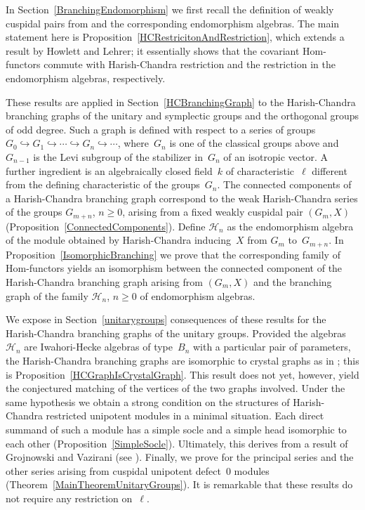 \documentclass[twoside,12pt]{amsart}
\theoremstyle{plain}
\begin{document}
In Section~\ref{BranchingEndomorphism} we first recall the definition of weakly cuspidal pairs from
\cite{GerberHissJacon2014} and the corresponding endomorphism algebras.
The main statement here is Proposition~\ref{HCRestricitonAndRestriction}, which 
extends a result by Howlett and Lehrer; it essentially shows
that the covariant Hom-functors commute with Harish-Chandra restriction
and the restriction in the endomorphism algebras, respectively. 

These results are applied in Section~\ref{HCBranchingGraph} to the Harish-Chandra branching graphs 
of the unitary and symplectic groups and the orthogonal groups of odd degree. 
Such a graph is defined with respect to a series of groups $G_0 \hookrightarrow 
G_1 \hookrightarrow \cdots \hookrightarrow G_n \hookrightarrow \cdots$, 
where~$G_n$ is one of the classical groups above and~$G_{n-1}$ is the Levi 
subgroup of the stabilizer in~$G_n$ of an isotropic vector. A further ingredient
is an algebraically closed field~$k$ of characteristic~$\ell$ different from the
defining characteristic of the groups~$G_n$.
The connected components of a Harish-Chandra branching graph correspond
to the weak Harish-Chandra series of the groups $G_{m + n}$, $n \geq 0$, arising 
from a fixed weakly cuspidal pair $(G_m,X)$ (Proposition~\ref{ConnectedComponents}). 
Define $\mathscr{H}_n$ as the endomorphism algebra of the module obtained by 
Harish-Chandra inducing~$X$ from $G_m$ to~$G_{m + n}$. In Proposition~\ref{IsomorphicBranching} 
we prove that the corresponding family of Hom-functors yields an isomorphism 
between the connected component of the Harish-Chandra branching graph arising from
$(G_m,X)$ and the branching graph of the family $\mathscr{H}_n$, $n \geq 0$ of 
endomorphism algebras.

We expose in Section~\ref{unitarygroups} consequences of these results 
for the Harish-Chandra branching graphs
of the unitary groups. Provided the algebras $\mathscr{H}_n$ 
are Iwahori-Hecke algebras of type~$B_n$ 
with a particular pair of parameters, the Harish-Chandra branching graphs are 
isomorphic to crystal graphs as in \cite[Conjecture~$5.7$]{GerberHissJacon2014};
this is Proposition~\ref{HCGraphIsCrystalGraph}. This result does not yet, however, 
yield the conjectured matching of the vertices of the two graphs involved.
Under the same hypothesis we obtain a strong condition on the structures of 
Harish-Chandra restricted unipotent modules in a minimal situation.
Each direct summand of such a module has a simple socle and a simple head 
isomorphic to each other (Proposition~\ref{SimpleSocle}). Ultimately, this
derives from a result of Grojnowski and Vazirani (see 
\cite[Theorem B]{GrojnowskiVazirani2001}).
Finally, we prove \cite[Conjecture~$5.7$]{GerberHissJacon2014} for the 
principal series and the other series arising from cuspidal unipotent defect~$0$ 
modules (Theorem~\ref{MainTheoremUnitaryGroups}). It is remarkable that these 
results do not require any restriction on~$\ell$. 
\end{document}

